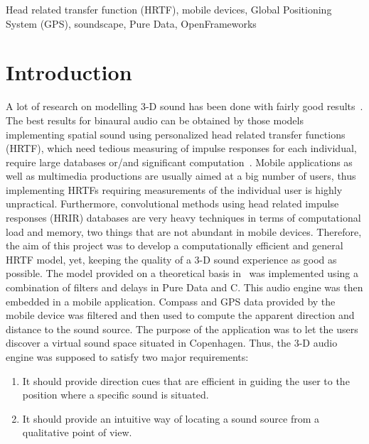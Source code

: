 \documentclass[journal]{IEEEtran}
\begin{document}
\begin{IEEEkeywords}
Head related transfer function (HRTF), mobile devices, Global Positioning System (GPS), soundscape, Pure Data, OpenFrameworks
\end{IEEEkeywords}



\section{Introduction}
A lot of research on modelling 3-D sound has been done with fairly good results~\cite{begault19943}. The best results for binaural audio can be obtained by those models implementing spatial sound using personalized head related transfer functions (HRTF), which need tedious measuring of impulse responses for each individual, require large databases or/and significant computation~\cite{SpatialAudio2007, Meshram2014}. Mobile applications as well as multimedia productions are usually aimed at a big number of users, thus implementing HRTFs requiring measurements of the individual user is highly unpractical. Furthermore, convolutional methods using head related impulse responses (HRIR) databases are very heavy techniques in terms of computational load and memory, two things that are not abundant in mobile devices. Therefore, the aim of this project was to develop a computationally efficient and general HRTF model, yet, keeping the quality of a 3-D sound experience as good as possible. The model provided on a theoretical basis in~\cite{Brown1997} was implemented using a combination of filters and delays in Pure Data and C. This audio engine was then embedded in a mobile application. Compass and GPS data provided by the mobile device was filtered and then used to compute the apparent direction and distance to the sound source. The purpose of the application was to let the users discover a virtual sound space situated in Copenhagen. Thus, the 3-D audio engine was supposed to satisfy two major requirements:
\begin{enumerate}
\item It should provide direction cues that are efficient in guiding the user to the position where a specific sound is situated.
\item It should provide an intuitive way of locating a sound source from a qualitative point of view.
\end{enumerate}
\end{document}
